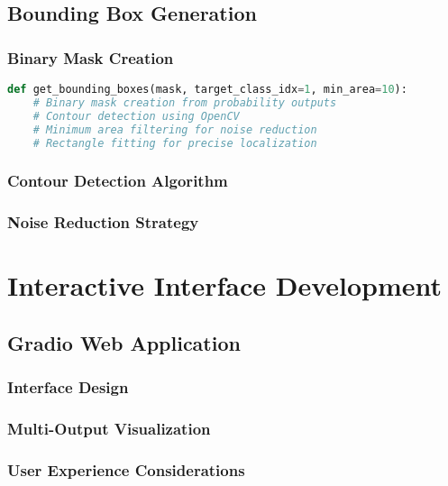 \documentclass[12pt,a4paper]{report}
\begin{document}
\subsection{Bounding Box Generation}

\subsubsection{Binary Mask Creation}

\begin{lstlisting}[language=Python, caption=Bounding Box Generation Pipeline]
def get_bounding_boxes(mask, target_class_idx=1, min_area=10):
    # Binary mask creation from probability outputs
    # Contour detection using OpenCV
    # Minimum area filtering for noise reduction
    # Rectangle fitting for precise localization
\end{lstlisting}

\subsubsection{Contour Detection Algorithm}

\subsubsection{Noise Reduction Strategy}

\section{Interactive Interface Development}

\subsection{Gradio Web Application}

\subsubsection{Interface Design}

\subsubsection{Multi-Output Visualization}

\subsubsection{User Experience Considerations}
\end{document}
